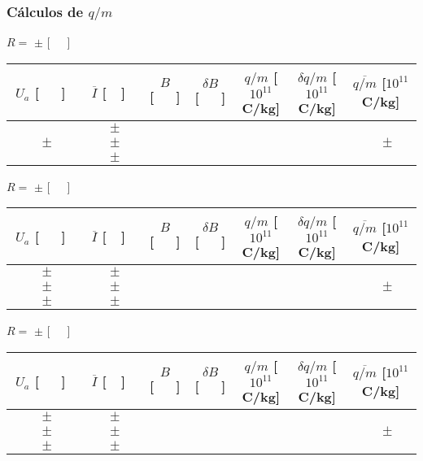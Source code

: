 \documentclass[a4paper,12pt]{article}  %
\begin{document}
\subsubsection{\sf Cálculos de $q/m$}
\label{sec:calc}
\begin{center}
	\bigskip
	\noindent	$R =$ \underline{\makebox[1.5cm][r]{~}}  $\pm$  	\underline{\makebox[1cm][r]{~}}  [~~~]
	\begin{tabular}{|c|c|c|c|c|c|c|}
	\hline %
	  $U_a$ [~~~] & $\overline{I}$ [~~] &  $B$ [~~~] & $\delta B$  [~~~] & $q/m$ [$10^{11}$C/kg] & $\delta q/m$ [$10^{11}$C/kg] & $\overline{q/m}$ [$10^{11}$C/kg]\\ \hline %
	 &$\qquad \pm \quad$&&&&& \\ \cline{2-6}
	$\qquad \pm \quad$ &$\qquad \pm \quad$&&&&& $\qquad \pm \quad$   \\ \cline{2-6}
	 &$\qquad \pm \quad$&&&&& \\ \hline 
 	\end{tabular}

	\noindent	$R =$ \underline{\makebox[1.5cm][r]{~}}  $\pm$  	\underline{\makebox[1cm][r]{~}}  [~~~]
	\begin{tabular}{|c|c|c|c|c|c|c|}  
	\hline %
	  $U_a$ [~~~] & $\overline{I}$ [~~] &  $B$ [~~~] & $\delta B$  [~~~] & $q/m$ [$10^{11}$C/kg] & $\delta q/m$ [$10^{11}$C/kg] & $\overline{q/m}$ [$10^{11}$C/kg]\\ \hline 
	 $\qquad \pm \quad$ &$\qquad \pm \quad$&&&&& \\ \cline{2-6}
	 $\qquad \pm \quad$ &$\qquad \pm \quad$&&&&& $\qquad \pm \quad$ \\ \cline{2-6}
	 $\qquad \pm \quad$ &$\qquad \pm \quad$&&&&& \\
	 \hline 
	\end{tabular}

	\noindent	$R =$ \underline{\makebox[1.5cm][r]{~}}  $\pm$  	\underline{\makebox[1cm][r]{~}}  [~~~]
	\begin{tabular}{|c|c|c|c|c|c|c|}  
	\hline %
	  $U_a$ [~~~] & $\overline{I}$ [~~] &  $B$ [~~~] & $\delta B$  [~~~] & $q/m$ [$10^{11}$C/kg] & $\delta q/m$ [$10^{11}$C/kg] & $\overline{q/m}$ [$10^{11}$C/kg]\\ \hline 
	 $\qquad \pm \quad$ &$\qquad \pm \quad$&&&&& \\ \cline{2-6}
	 $\qquad \pm \quad$ &$\qquad \pm \quad$&&&&& $\qquad \pm \quad$ \\ \cline{2-6}
	 $\qquad \pm \quad$ &$\qquad \pm \quad$&&&&& \\
	 \hline 
	\end{tabular}


\end{center}
\end{document}
